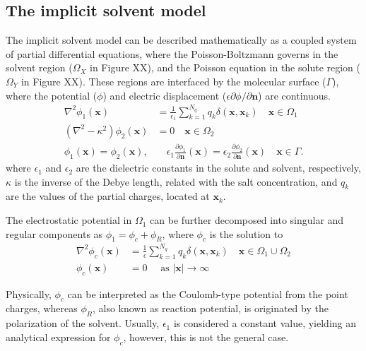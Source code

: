 \subsection*{\sffamily \large The implicit solvent model}

The implicit solvent model can be described mathematically as a coupled system of partial differential equations, where the Poisson-Boltzmann governs in the solvent region ($\Omega_X$ in Figure XX), and the Poisson equation in the solute region ($\Omega_Y$ in Figure XX). These regions are interfaced by the molecular surface ($\Gamma$), where the potential ($\phi$) and electric displacement ($\epsilon\partial\phi/\partial\mathbf{n}$) are continuous. 
%
\begin{align}\label{eq:pbe}
\nabla^2\phi_1(\mathbf{x}) &= \frac{1}{\epsilon_1}\sum_{k=1}^{N_q} q_k\delta(\mathbf{x},\mathbf{x}_k) \quad  \mathbf{x} \in \Omega_1\nonumber\\
\left(\nabla^2 - \kappa^2\right)\phi_2(\mathbf{x})  &= 0 \quad\mathbf{x}\in\Omega_2\nonumber\\
\phi_1(\mathbf{x})  = \phi_2 (\mathbf{x}), &\quad \epsilon_1\frac{\partial\phi_1}{\partial\mathbf{n}}(\mathbf{x})  = \epsilon_2\frac{\partial\phi_2}{\partial\mathbf{n}}(\mathbf{x})  \quad \mathbf{x}\in \Gamma. 
\end{align}
%
where $\epsilon_1$ and $\epsilon_2$ are the dielectric constants in the solute and solvent, respectively, $\kappa$ is the inverse of the Debye length, related with the salt concentration, and $q_k$ are the values of the partial charges, located at $\mathbf{x}_k$.

The electrostatic potential in $\Omega_1$ can be further decomposed into singular and regular components as $\phi_1 = \phi_c + \phi_R$, where $\phi_c$ is the solution to
%
\begin{align}\label{eq:phic}
\nabla^2\phi_c(\mathbf{x}) &= \frac{1}{\epsilon}\sum_{k=1}^{N_q}q_k\delta(\mathbf{x},\mathbf{x}_k) \quad \mathbf{x}\in\Omega_1\cup\Omega_2\nonumber\\
\phi_c(\mathbf{x})&=0 \quad \text{ as } |\mathbf{x}|\to\infty
\end{align}

Physically, $\phi_c$ can be interpreted as the Coulomb-type potential from the point charges, whereas $\phi_R$, also known as reaction potential, is originated by the polarization of the solvent. 
Usually, $\epsilon_1$ is considered a constant value, yielding an analytical expression for $\phi_c$, however, this is not the general case.

